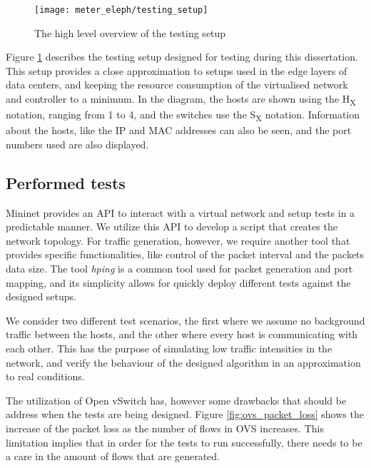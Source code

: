 \pagebreak

\begin{figure} 
    \centering
    \texttt{[image: meter\_eleph/testing\_setup]}
    \caption {The high level overview of the testing setup}
    \label{fig:test_setup}
\end{figure} 

\par Figure \ref{fig:test_setup} describes the testing setup designed for testing during this dissertation. This setup provides a close approximation to setups used
in the edge layers of data centers, and keeping the resource consumption of the virtualised network and controller to a minimum. In the diagram, the hosts are shown
using the H\textsubscript{X} notation, ranging from 1 to 4, and the switches use the S\textsubscript{X}  notation. Information about the hosts, like the IP and MAC
addresses can also be seen, and the port numbers used are also displayed.

\subsection{Performed tests}

Mininet provides an API to interact with a virtual network and setup tests in a predictable manner. We utilize this API to develop a script that creates the network
topology. For traffic generation, however, we require another tool that provides specific functionalities, like control of the packet interval and the packets data
size. The tool \textit{hping} is a common tool used for packet generation and port mapping, and its simplicity allows for quickly deploy different tests
against the designed setups.

\par We consider two different test scenarios, the first where we assume no background traffic between the hosts, and the other where every host is communicating
with each other. This has the purpose of simulating low traffic intensities in the network, and verify the behaviour of the designed algorithm in an
approximation to real conditions.

\par The utilization of Open vSwitch has, however some drawbacks that should be address when the tests are being designed. Figure \ref{fig:ovs_packet_loss} shows
the increase of the packet loss as the number of flows in OVS increases. This limitation implies that in order for the tests to run successfully, there needs to be
a care in the amount of flows that are generated.

